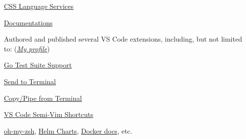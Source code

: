 \documentclass[9pt,a4paper]{extarticle}
\begin{document}
\begin{customitemize}
\begin{customitemize}
\begin{customitemize}
\begin{customitemize}
                \item{\href{https://github.com/microsoft/vscode-css-languageservice/pulls?q=is\%3Apr+author\%3Ababakks}{CSS Language Services }}
                \item{\href{https://github.com/microsoft/vscode-docs/pulls?q=is\%3Apr+author\%3Ababakks}{Documentations }}
            \end{customitemize}
            \item{Authored and published several VS Code extensions, including, but not limited to: (\href{https://marketplace.visualstudio.com/publishers/babakks}{\textit{My profile}})}
            \begin{customitemize}
                \item{\href{https://marketplace.visualstudio.com/items?itemName=babakks.vscode-go-test-suite}{Go Test Suite Support} }
                \item{\href{https://marketplace.visualstudio.com/items?itemName=babakks.vscode-send-to-terminal}{Send to Terminal} }
                \item{\href{https://marketplace.visualstudio.com/items?itemName=babakks.vscode-copy-from-terminal}{Copy/Pipe from Terminal} }
                \item{\href{https://marketplace.visualstudio.com/items?itemName=babakks.vscode-vim-shortcuts}{VS Code Semi-Vim Shortcuts} }
            \end{customitemize}
        \end{customitemize}
        \item {}
        \begin{customitemize}
            \item{
            \href{https://github.com/ohmyzsh/ohmyzsh/pulls?q=author\%3Ababakks}{oh-my-zsh},
            \href{https://github.com/helm/charts/pulls?q=is\%3Apr+author%3Ababakks}{Helm Charts},
                \href{https://github.com/docker-library/docs/pulls?q=is\%3Apr+author\%3Ababakks}{Docker docs},
                etc.
            }
        \end{customitemize}
    \end{customitemize}


\end{customitemize}
\end{document}
